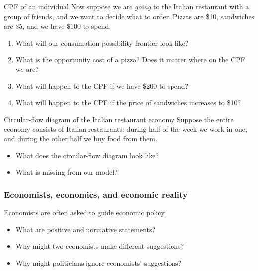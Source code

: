 \documentclass[aspectratio=169]{beamer}
\begin{document}
\begin{frame}{CPF of an individual}
    Now suppose we are \textit{going} to the Italian restaurant with a group of friends, and we want to decide what to order. Pizzas are \$10, sandwiches are \$5, and we have \$100 to spend.
    \begin{enumerate}
        \item What will our consumption possibility frontier look like?
        \item What is the opportunity cost of a pizza? Does it matter where on the CPF we are?
        \item What will happen to the CPF if we have \$200 to spend?
        \item What will happen to the CPF if the price of sandwiches increases to \$10?
    \end{enumerate}
\end{frame}

\begin{frame}{Circular-flow diagram of the Italian restaurant economy}
    Suppose the entire economy consists of Italian restaurants: during half of the week we work in one, and during the other half we buy food from them.

    \medskip

    \begin{itemize}
        \item What does the circular-flow diagram look like?
        \item What is missing from our model?
    \end{itemize}

\end{frame}

\begin{frame}
    \frametitle{Economists, economics, and economic reality}    
    Economists are often asked to guide economic policy.
    \begin{itemize}
        \item What are positive and normative statements?
        \item Why might two economists make different suggestions?
        \item Why might politicians ignore economists' suggestions?
    \end{itemize}
\end{frame}
\end{document}
